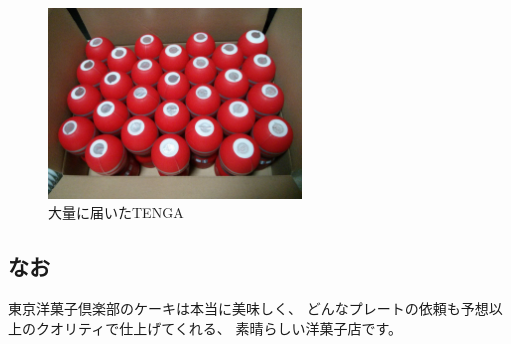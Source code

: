 \begin{figure}[H]
\centering
\includegraphics[width=0.6\textwidth]{../images/birthday_tenga.jpg}
\caption{大量に届いたTENGA}
\end{figure}

\subsection{なお}

東京洋菓子倶楽部のケーキは本当に美味しく、
どんなプレートの依頼も予想以上のクオリティで仕上げてくれる、
素晴らしい洋菓子店です。
